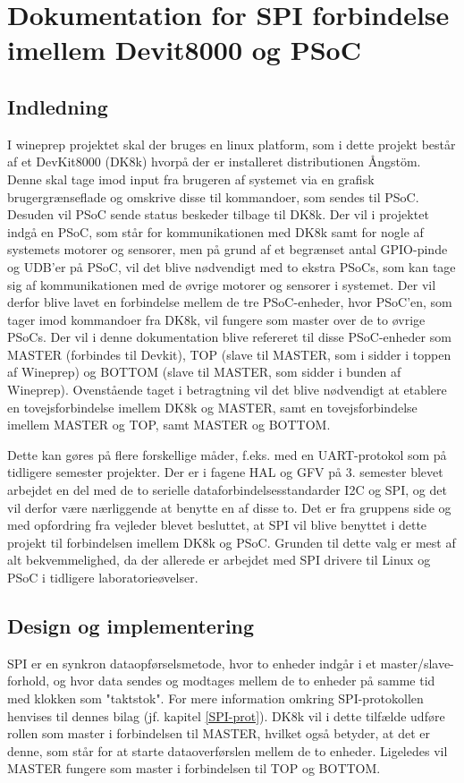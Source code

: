\chapter{Dokumentation for SPI forbindelse imellem Devit8000 og PSoC}

\section{Indledning}
I wineprep projektet skal der bruges en linux platform, som i dette projekt består af et DevKit8000 (DK8k) hvorpå der er installeret distributionen Ångstöm. 
Denne skal tage imod input fra brugeren af systemet via en grafisk brugergrænseflade og omskrive disse til kommandoer, som sendes til PSoC. Desuden
vil PSoC sende status beskeder tilbage til DK8k.
Der vil i projektet indgå en PSoC, som står for kommunikationen med DK8k samt for nogle af systemets motorer og sensorer,
men på grund af et begrænset antal GPIO-pinde og UDB'er på PSoC, vil det blive nødvendigt med to ekstra PSoCs, som kan tage sig af kommunikationen med de 
øvrige motorer og sensorer i systemet. Der vil derfor blive lavet en forbindelse mellem de tre PSoC-enheder, hvor PSoC'en, som tager imod kommandoer fra
DK8k, vil fungere som master over de to øvrige PSoCs. Der vil i denne dokumentation blive refereret til disse PSoC-enheder som MASTER
(forbindes til Devkit), TOP (slave til MASTER, som i sidder i toppen af Wineprep) og BOTTOM (slave til MASTER, som sidder i bunden af
Wineprep).
Ovenstående taget i betragtning vil det blive nødvendigt at etablere en tovejsforbindelse imellem DK8k og MASTER, samt en tovejsforbindelse imellem 
MASTER og TOP, samt MASTER og BOTTOM. 

Dette kan gøres på flere forskellige måder, f.eks. med en UART-protokol som på tidligere semester projekter. Der er i fagene HAL og GFV på 3. semester 
blevet arbejdet en del med de to serielle dataforbindelsesstandarder I2C og SPI, og det vil derfor være nærliggende at benytte en af disse to. 
Det er fra gruppens side og med opfordring fra vejleder blevet besluttet, at SPI vil blive benyttet i dette projekt til forbindelsen imellem DK8k og 
PSoC. Grunden til dette valg er mest af alt bekvemmelighed, da der allerede er arbejdet med SPI drivere til Linux og PSoC i tidligere laboratorieøvelser.   

\section{Design og implementering}
SPI er en synkron dataopførselsmetode, hvor to enheder indgår i et master/slave-forhold, og hvor data sendes og modtages mellem de to enheder på
samme tid med klokken som "taktstok". For mere information omkring SPI-protokollen henvises til dennes bilag (jf. kapitel \ref{SPI-prot}).
DK8k vil i dette tilfælde udføre rollen som master i forbindelsen til MASTER, hvilket også betyder, at det er denne, som står for at starte 
dataoverførslen mellem de to enheder. Ligeledes vil MASTER fungere som master i forbindelsen til TOP og BOTTOM.

